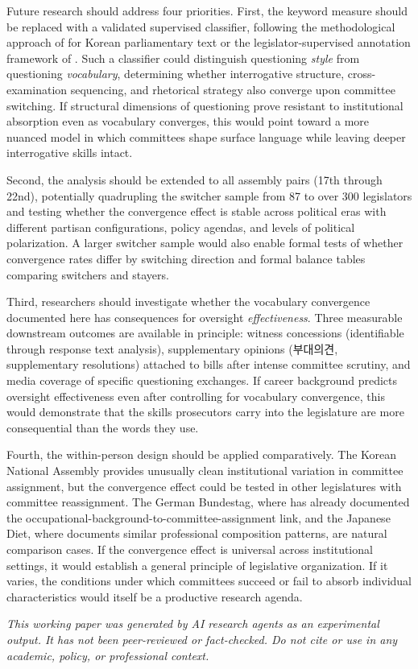 \documentclass[11pt]{article}
\begin{document}
Future research should address four priorities. First, the keyword measure should be replaced with a validated supervised classifier, following the methodological approach of \citet{han2022} for Korean parliamentary text or the legislator-supervised annotation framework of \citet{matsuo2025}. Such a classifier could distinguish questioning \textit{style} from questioning \textit{vocabulary}, determining whether interrogative structure, cross-examination sequencing, and rhetorical strategy also converge upon committee switching. If structural dimensions of questioning prove resistant to institutional absorption even as vocabulary converges, this would point toward a more nuanced model in which committees shape surface language while leaving deeper interrogative skills intact.

Second, the analysis should be extended to all assembly pairs (17th through 22nd), potentially quadrupling the switcher sample from 87 to over 300 legislators and testing whether the convergence effect is stable across political eras with different partisan configurations, policy agendas, and levels of political polarization. A larger switcher sample would also enable formal tests of whether convergence rates differ by switching direction and formal balance tables comparing switchers and stayers.

Third, researchers should investigate whether the vocabulary convergence documented here has consequences for oversight \textit{effectiveness}. Three measurable downstream outcomes are available in principle: witness concessions (identifiable through response text analysis), supplementary opinions (부대의견, supplementary resolutions) attached to bills after intense committee scrutiny, and media coverage of specific questioning exchanges. If career background predicts oversight effectiveness even after controlling for vocabulary convergence, this would demonstrate that the skills prosecutors carry into the legislature are more consequential than the words they use.

Fourth, the within-person design should be applied comparatively. The Korean National Assembly provides unusually clean institutional variation in committee assignment, but the convergence effect could be tested in other legislatures with committee reassignment. The German Bundestag, where \citet{mickler2017} has already documented the occupational-background-to-committee-assignment link, and the Japanese Diet, where \citet{joshi2019} documents similar professional composition patterns, are natural comparison cases. If the convergence effect is universal across institutional settings, it would establish a general principle of legislative organization. If it varies, the conditions under which committees succeed or fail to absorb individual characteristics would itself be a productive research agenda.

\bigskip
\noindent\textit{This working paper was generated by AI research agents as an
experimental output. It has not been peer-reviewed or fact-checked.
Do not cite or use in any academic, policy, or professional context.}



\end{document}
